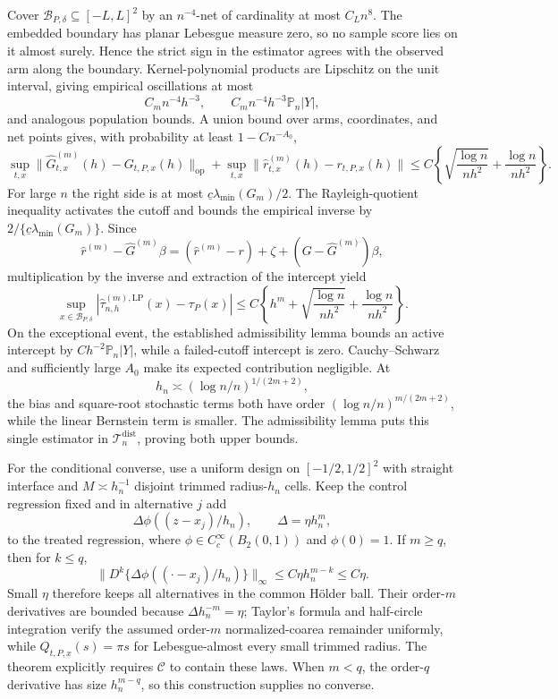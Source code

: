 Cover \(\mathcal B_{P,\delta}\subseteq[-L,L]^2\) by an \(n^{-4}\)-net of cardinality at most \(C_Ln^8\).  The embedded boundary has planar Lebesgue measure zero, so no sample score lies on it almost surely.  Hence the strict sign in the estimator agrees with the observed arm along the boundary.  Kernel-polynomial products are Lipschitz on the unit interval, giving empirical oscillations at most
\[
 C_mn^{-4}h^{-3},
 \qquad C_mn^{-4}h^{-3}\mathbb P_n|Y|,
\]
and analogous population bounds.  A union bound over arms, coordinates, and net points gives, with probability at least \(1-Cn^{-A_0}\),
\[
 \sup_{t,x}\lVert\widehat G^{(m)}_{t,x}(h)-G_{t,P,x}(h)\rVert_{\mathrm{op}}
 +\sup_{t,x}\lVert\widehat r^{(m)}_{t,x}(h)-r_{t,P,x}(h)\rVert
 \leq C\left\{\sqrt{\frac{\log n}{nh^2}}+\frac{\log n}{nh^2}\right\}.
\]
For large \(n\) the right side is at most \(\underline c\lambda_{\min}(G_m)/2\).  The Rayleigh-quotient inequality activates the cutoff and bounds the empirical inverse by \(2/\{\underline c\lambda_{\min}(G_m)\}\).  Since
\[
 \widehat r^{(m)}-\widehat G^{(m)}\beta
 =(\widehat r^{(m)}-r)+\zeta+(G-\widehat G^{(m)})\beta,
\]
multiplication by the inverse and extraction of the intercept yield
\[
 \sup_{x\in\mathcal B_{P,\delta}}
 |\widehat\tau^{(m),\mathrm{LP}}_{n,h}(x)-\tau_P(x)|
 \leq C\left\{h^m+\sqrt{\frac{\log n}{nh^2}}+\frac{\log n}{nh^2}\right\}.
\]
On the exceptional event, the established admissibility lemma bounds an active intercept by \(Ch^{-2}\mathbb P_n|Y|\), while a failed-cutoff intercept is zero.  Cauchy--Schwarz and sufficiently large \(A_0\) make its expected contribution negligible.  At
\[
 h_n\asymp(\log n/n)^{1/(2m+2)},
\]
the bias and square-root stochastic terms both have order \((\log n/n)^{m/(2m+2)}\), while the linear Bernstein term is smaller.  The admissibility lemma puts this single estimator in \(\mathcal T_n^{\mathrm{dist}}\), proving both upper bounds.

For the conditional converse, use a uniform design on \([-1/2,1/2]^2\) with straight interface and \(M\asymp h_n^{-1}\) disjoint trimmed radius-\(h_n\) cells.  Keep the control regression fixed and in alternative \(j\) add
\[
 \Delta\phi((z-x_j)/h_n),
 \qquad \Delta=\eta h_n^m,
\]
to the treated regression, where \(\phi\in C_c^\infty(B_2(0,1))\) and \(\phi(0)=1\).  If \(m\geq q\), then for \(k\leq q\),
\[
 \lVert D^k\{\Delta\phi((\cdot-x_j)/h_n)\}\rVert_\infty
 \leq C\eta h_n^{m-k}\leq C\eta.
\]
Small \(\eta\) therefore keeps all alternatives in the common H\"older ball.  Their order-\(m\) derivatives are bounded because \(\Delta h_n^{-m}=\eta\); Taylor's formula and half-circle integration verify the assumed order-\(m\) normalized-coarea remainder uniformly, while \(Q_{t,P,x}(s)=\pi s\) for Lebesgue-almost every small trimmed radius.  The theorem explicitly requires \(\mathcal C\) to contain these laws.  When \(m<q\), the order-\(q\) derivative has size \(h_n^{m-q}\), so this construction supplies no converse.

